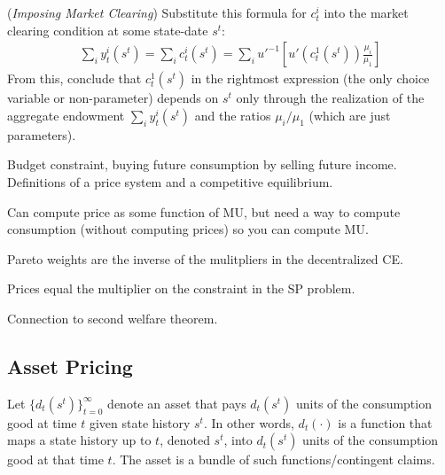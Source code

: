 \documentclass[12pt]{article}
\theoremstyle{plain}
\theoremstyle{definition}
\theoremstyle{remark}
\newcommand{\tinfz}{^\infty_{t=0}}
\begin{document}
(\emph{Imposing Market Clearing})
Substitute this formula for $c_t^i$ into the market clearing condition
at some state-date $s^t$:
\begin{align*}
  \sum_i y_t^i(s^t)
  =
  \sum_i c_t^i(s^t)
  =
  \sum_i
  u'^{-1}
  \left[
  u'\left(c_t^1(s^t)\right)
  \frac{\mu_i}{\mu_1}
  \right]
\end{align*}
From this, conclude that $c^1_t(s^t)$
in the rightmost expression (the only choice variable or
non-parameter) depends on $s^t$ only through the realization of the
aggregate endowment $\sum_i y_t^i(s^t)$ and the ratios $\mu_i/\mu_1$
(which are just parameters).

\begin{comment}
Therefore, conclude that
\begin{align*}
  s^t, \tilde{s}^\tau
  \quad\text{s.t.}\quad
  \sum_i y_t^i(s^t)
  = \sum_i y_\tau^i(\tilde{s}^\tau)
  \quad\implies\quad
  c_t^i(s^t) = c_\tau^i(\tilde{s}^\tau)
  \qquad \forall i
\end{align*}
That is, even for compeletely different times $t\neq \tau$, if the
state histories $s^t$, $\tilde{s}^\tau$ are such that aggregate
endowments have the same realized value at those times, consumption
will be \emph{the same} for \emph{all agents}.  Only the aggregate
endowment and parameters $\mu_i$ matter for an agent's consumption
at a particular time---not how you got to that aggregate endowment
or when you got to that aggregate endowment.
\end{comment}

Budget constraint, buying future consumption by selling future income.
Definitions of a price system and a competitive equilibrium.

Can compute price as some function of MU, but need a way to compute
consumption (without computing prices) so you can compute MU.

Pareto weights are the inverse of the mulitpliers in the decentralized
CE.

Prices equal the multiplier on the constraint in the SP problem.

Connection to second welfare theorem.

\clearpage
\subsection{Asset Pricing}

Let $\{d_t(s^t)\}\tinfz$ denote an asset that pays $d_t(s^t)$ units of
the consumption good at time $t$ given state history $s^t$. In other
words, $d_t(\cdot)$ is a function that maps a state history up to $t$,
denoted $s^t$, into $d_t(s^t)$  units of the consumption good at that
time $t$. The asset is a bundle of such functions/contingent claims.
\end{document}
